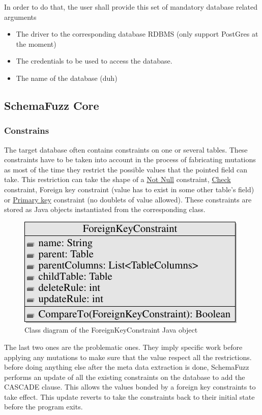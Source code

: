 \documentclass{article}
\begin{document}
\begin{empfile}
In order to do that, the user shall provide this set of mandatory database related arguments
			\begin{itemize}
 				\item The driver to the corresponding database RDBMS (only support PostGres at the moment)
 				\item The credentials to be used to access the database.
 				\item The name of the database (duh)
			\end{itemize}
		\subsection{SchemaFuzz Core}		
			\subsubsection{Constrains}
The target database often contains constraints on one or several tables. These constraints have to be taken into account in the process of fabricating mutations as most of the time they restrict the possible values that the pointed field can take. This restriction can take the shape of a \underline {Not Null} constraint, \underline{Check} constraint, {Foreign key} constraint (value has to exist in some other table's field) or \underline{Primary key} constraint (no doublets of value allowed). These constraints are stored as Java objects instantiated from the corresponding class.
\bigskip

\begin{figure} [h!]
\centering
\includegraphics[width=\textwidth]{ForeignKeyClassDiagram-1.pdf}
\caption{Class diagram of the ForeignKeyConstraint Java object}
\end{figure}

\bigskip

The last two ones are the problematic ones. They imply specific work before applying any mutations to make sure that the value respect all the restrictions. before doing anything else after the meta data extraction is done, SchemaFuzz performs an update of all the existing constraints on the database to add the CASCADE clause. This allows the values bonded by a foreign key constraints to take effect. This update reverts to take the constraints back to their initial state before the program exits.

\end{empfile}
\end{document}
